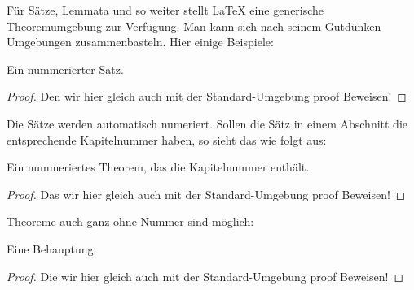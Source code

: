 
Für Sätze, Lemmata und so weiter stellt LaTeX eine generische Theoremumgebung zur Verfügung. Man kann sich nach seinem Gutdünken Umgebungen zusammenbasteln. Hier einige Beispiele:

\begin{satz} 
   Ein nummerierter Satz. 
\end{satz}

\begin{proof}
   Den wir hier gleich auch mit der Standard-Umgebung proof Beweisen!
\end{proof}

Die Sätze werden automatisch numeriert. Sollen die Sätz in einem Abschnitt die entsprechende Kapitelnummer haben, so sieht das wie folgt aus:

\begin{theorem} 
   Ein nummeriertes Theorem, das die Kapitelnummer enthält. 
\end{theorem}

\begin{proof}
   Das wir hier gleich auch mit der Standard-Umgebung proof Beweisen!
\end{proof}

Theoreme auch ganz ohne Nummer sind möglich:

\begin{behauptung}
   Eine Behauptung
\end{behauptung}

\begin{proof}
   Die wir hier gleich auch mit der Standard-Umgebung proof Beweisen!
\end{proof}
